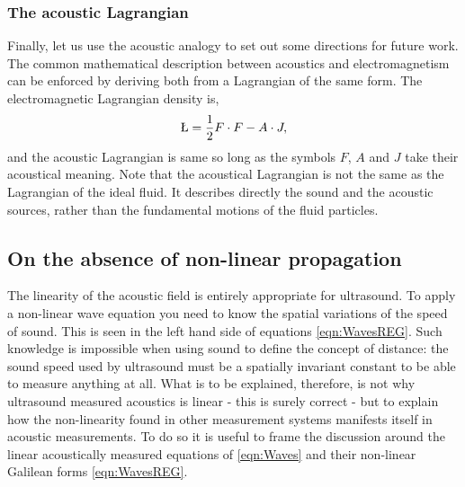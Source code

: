 \documentclass[10pt, fleqn,final,showtrims,oldfontcommands]{article} %
\newcommand{\eqnref}[1]{\ref{eqn:#1}}
\begin{document}
\subsubsection{The acoustic Lagrangian}\label{sec:int:spin}
Finally, let us use the acoustic analogy to set out some directions for future work.
%
The common mathematical  description between acoustics and electromagnetism can be enforced by deriving both from a Lagrangian of the same form.
The electromagnetic Lagrangian density is\cite{Lasenby1993, Doran2003},
\begin{align}
 \L = \frac{1}{2} F \cdot F  - A \cdot J, \label{eqn:Lagrangian}
\end{align}
and the acoustic Lagrangian is same so long as the symbols $F$, $A$ and $J$ take their 
acoustical meaning.
Note that the acoustical Lagrangian is not the same as the Lagrangian of the ideal fluid.
It describes directly the sound and the acoustic sources,
rather than the fundamental motions of the fluid particles.


\subsection{On the absence of non-linear propagation} \label{sec:NonlinearProp}

The linearity of the acoustic field is entirely appropriate for ultrasound.
To apply a non-linear wave equation you need to know 
the spatial variations of the speed of sound. 
This is seen in the left hand side of equations \eqnref{WavesREG}.
Such knowledge is impossible
when using sound to define the concept of distance:
the sound speed used by ultrasound must be a spatially invariant constant to be able to measure anything at all.
What is to be explained, therefore, 
is not why ultrasound measured acoustics is linear - this is surely correct - 
but to explain how the non-linearity found in other measurement systems  manifests itself in acoustic measurements.
To do so it is useful to frame the discussion around the linear acoustically measured equations of
\eqnref{Waves}
and their non-linear Galilean forms \eqnref{WavesREG}.
\end{document}
